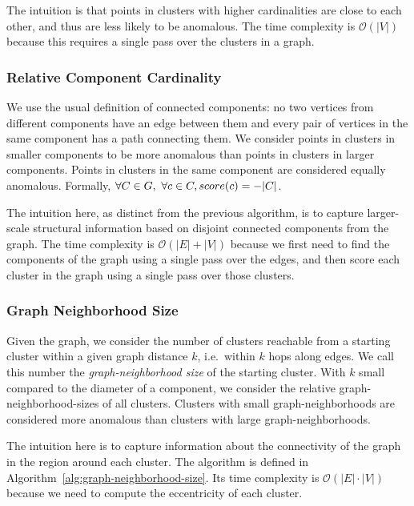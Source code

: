The intuition is that points in clusters with higher cardinalities are close to each other, and thus are less likely to be anomalous.
The time complexity is $\mathcal{O}(|V|)$ because this requires a single pass over the clusters in a graph.


\subsubsection{Relative Component Cardinality}
\label{subsubsec:methods:individual-algorithms:relative-component-cardinality}
We use the usual definition of connected components:
no two vertices from different components have an edge between them and every pair of vertices in the same component has a path connecting them.
We consider points in clusters in smaller components to be more anomalous than points in clusters in larger components.
Points in clusters in the same component are considered equally anomalous.
Formally, $\forall C \in G, \ \forall c \in C,  \\score(c) = -|C|$.

The intuition here, as distinct from the previous algorithm, is to capture larger-scale structural information based on disjoint connected components from the graph.
The time complexity is $\mathcal{O}(|E| + |V|)$ because we first need to find the components of the graph using a single pass over the edges, and then score each cluster in the graph using a single pass over those clusters.


\subsubsection{Graph Neighborhood Size}
\label{subsubsec:methods:individual-algorithms:graph-neighborhood-size}
Given the graph, we consider the number of clusters reachable from a starting cluster within a given graph distance $k$, i.e.\ within $k$ hops along edges.
We call this number the \textit{graph-neighborhood size} of the starting cluster.
With $k$ small compared to the diameter of a component, we consider the relative graph-neighborhood-sizes of all clusters.
Clusters with small graph-neighborhoods are considered more anomalous than clusters with large graph-neighborhoods.

The intuition here is to capture information about the connectivity of the graph in the region around each cluster.
The algorithm is defined in Algorithm~\ref{alg:graph-neighborhood-size}.
Its time complexity is $\mathcal{O}(|E| \cdot |V|)$ because we need to compute the eccentricity of each cluster.

